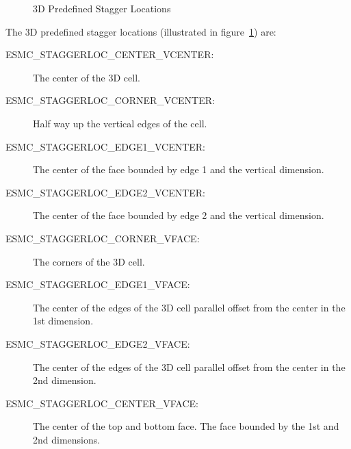 \medskip

\begin{center}
\begin{figure}
\center
{}
\caption{3D Predefined Stagger Locations}
\label{fig:gridstaggerloc3d}
\end{figure}
\end{center}

The 3D predefined stagger locations (illustrated in figure~\ref{fig:gridstaggerloc3d}) are:\\
\begin{description}
\item [ESMC\_STAGGERLOC\_CENTER\_VCENTER:] The center of the 3D cell.
\item [ESMC\_STAGGERLOC\_CORNER\_VCENTER:] Half way up the vertical edges of the cell.
\item [ESMC\_STAGGERLOC\_EDGE1\_VCENTER:] The center of the face bounded by edge 1 and the vertical dimension.
\item [ESMC\_STAGGERLOC\_EDGE2\_VCENTER:] The center of the face bounded by edge 2 and the vertical dimension. 
\item [ESMC\_STAGGERLOC\_CORNER\_VFACE:] The corners of the 3D cell.
\item [ESMC\_STAGGERLOC\_EDGE1\_VFACE:] The center of the edges of the 3D cell parallel offset from the center in the 1st dimension.
\item [ESMC\_STAGGERLOC\_EDGE2\_VFACE:] The center of the edges of the 3D cell parallel offset from the center in the 2nd dimension.
\item [ESMC\_STAGGERLOC\_CENTER\_VFACE:] The center of the top and bottom face. The face bounded by the 1st and 2nd dimensions. 
\end{description}

